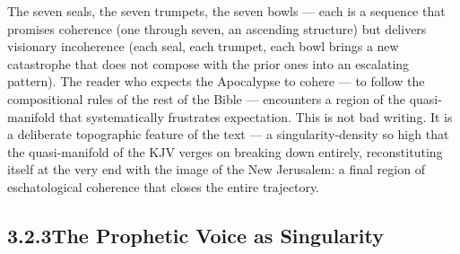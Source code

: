 The seven seals, the seven trumpets, the seven bowls — each is a sequence that promises coherence (one through seven, an ascending structure) but delivers visionary incoherence (each seal, each trumpet, each bowl brings a new catastrophe that does not compose with the prior ones into an escalating pattern). The reader who expects the Apocalypse to cohere — to follow the compositional rules of the rest of the Bible — encounters a region of the quasi-manifold that systematically frustrates expectation. This is not bad writing. It is a deliberate topographic feature of the text — a singularity-density so high that the quasi-manifold of the KJV verges on breaking down entirely, reconstituting itself at the very end with the image of the New Jerusalem: a final region of eschatological coherence that closes the entire trajectory.

\subsection{3.2.3\quad The Prophetic Voice as Singularity}

